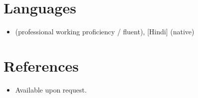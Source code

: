 \documentclass[11pt,a4paper,sans]{moderncv}
\begin{document}

\section{Languages}
\vspace{1pt}
\begin{itemize}
\item [English] (professional working proficiency / fluent), [Hindi] (native)
\end{itemize}



\section{References}
\vspace{1pt}
\begin{itemize}
\item{Available upon request.}
\end{itemize}
\end{document}
